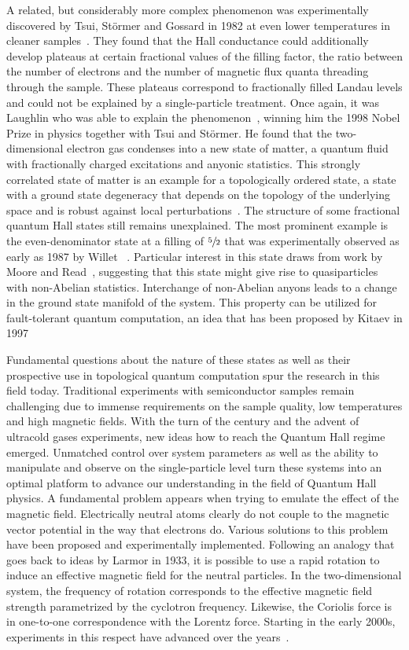 A related, but considerably more complex phenomenon was experimentally discovered by Tsui, Störmer and Gossard in 1982 at even lower temperatures in cleaner samples~\cite{Tsui1982}.
They found that the Hall conductance could additionally develop plateaus at certain fractional values of the filling factor, the ratio between the number of electrons and the number of magnetic flux quanta threading through the sample.
These plateaus correspond to fractionally filled Landau levels and could not be explained by a single-particle treatment.
Once again, it was Laughlin who was able to explain the phenomenon~\cite{Laughlin1983}, winning him the 1998 Nobel Prize in physics together with Tsui and Störmer.
He found that the two-dimensional electron gas condenses into a new state of matter, a quantum fluid with fractionally charged excitations and anyonic statistics.
This strongly correlated state of matter is an example for a topologically ordered state, a state with a ground state degeneracy that depends on the topology of the underlying space and is robust against local perturbations~\cite{Wen1990,Wen1995}.
The structure of some fractional quantum Hall states still remains unexplained.
The most prominent example is the even-denominator state at a filling of $\sfrac{5}{2}$ that was experimentally observed as early as 1987 by Willet \etal~\cite{Willett1987}.
Particular interest in this state draws from work by Moore and Read~\cite{Moore1991}, suggesting that this state might give rise to quasiparticles with non-Abelian statistics.
Interchange of non-Abelian anyons leads to a change in the ground state manifold of the system. This property can be utilized for fault-tolerant quantum computation, an idea that has been proposed by Kitaev in 1997~\cite{Kitaev2003}

Fundamental questions about the nature of these states as well as their prospective use in topological quantum computation spur the research in this field today.
Traditional experiments with semiconductor samples remain challenging due to immense requirements on the sample quality, low temperatures and high magnetic fields.
With the turn of the century and the advent of ultracold gases experiments, new ideas how to reach the Quantum Hall regime emerged.
Unmatched control over system parameters as well as the ability to manipulate and observe on the single-particle level turn these systems into an optimal platform to advance our understanding in the field of Quantum Hall physics.
A fundamental problem appears when trying to emulate the effect of the magnetic field.
Electrically neutral atoms clearly do not couple to the magnetic vector potential in the way that electrons do.
Various solutions to this problem have been proposed and experimentally implemented.
Following an analogy that goes back to ideas by Larmor in 1933, it is possible to use a rapid rotation to induce an effective magnetic field for the neutral particles.
In the two-dimensional system, the frequency of rotation corresponds to the effective magnetic field strength parametrized by the cyclotron frequency.
Likewise, the Coriolis force is in one-to-one correspondence with the Lorentz force.
Starting in the early 2000s, experiments in this respect have advanced over the years~\cite{Schweikhard2004,Bretin2004,Cooper2008,Fetter2009}.

